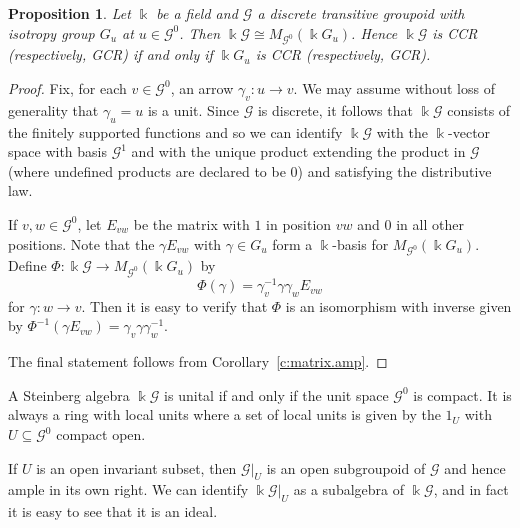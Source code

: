 \documentclass[11pt,reqno]{amsart}
\theoremstyle{plain}
\newtheorem{prop}[thm]{Proposition}
\numberwithin{equation}{section}
\begin{document}
\begin{prop}\label{p:discrete.groupoid}
Let $\Bbbk$ be a field and $\mathscr G$ a discrete transitive groupoid with isotropy group $G_u$ at $u\in \mathscr G^0$.  Then $\Bbbk \mathscr G\cong M_{\mathscr G^0}(\Bbbk G_u)$.  Hence $\Bbbk \mathscr G$ is CCR (respectively, GCR) if and only if $\Bbbk G_u$ is CCR (respectively, GCR).
\end{prop}
\begin{proof}
Fix, for each $v\in \mathscr G^0$, an arrow $\gamma_v\colon u\to v$.  We may assume without loss of generality that $\gamma_u=u$ is a unit.  Since $\mathscr G$ is discrete, it follows that $\Bbbk\mathscr G$ consists of the finitely supported functions and so we can identify $\Bbbk \mathscr G$ with the $\Bbbk$-vector space with basis $\mathscr G^1$ and with the unique product extending the product in $\mathscr G$ (where undefined products are declared to be $0$) and satisfying the distributive law.

If $v,w\in \mathscr G^0$, let $E_{ vw}$ be the matrix with $1$ in position $vw$ and $0$ in all other positions.  Note that the $\gamma E_{vw}$ with $\gamma\in G_u$ form a $\Bbbk$-basis for $M_{\mathscr G^0}(\Bbbk G_u)$.  Define $\Phi\colon \Bbbk\mathscr G\to M_{\mathscr G^0}(\Bbbk G_u)$ by \[\Phi(\gamma) = \gamma_v^{-1}\gamma\gamma_wE_{vw}\] for $\gamma\colon w\to v$.  Then it is easy to verify that $\Phi$ is an isomorphism with inverse given by $\Phi^{-1}(\gamma E_{vw}) = \gamma_v\gamma\gamma_w^{-1}$.

The final statement follows from Corollary~\ref{c:matrix.amp}.
\end{proof}


A Steinberg algebra $\Bbbk\mathscr G$ is unital if and only if the unit space $\mathscr G^0$ is compact.  It is always a ring with local units where a set of  local units is given by the $1_U$ with $U\subseteq \mathscr G^0$ compact open.

If $U$ is an open invariant subset, then $\mathscr G|_U$ is an open subgroupoid of $\mathscr G$ and hence ample in its own right.  We can identify $\Bbbk \mathscr G|_U$ as a subalgebra of $\Bbbk \mathscr G$, and in fact it is easy to see that it is an ideal.
\end{document}
